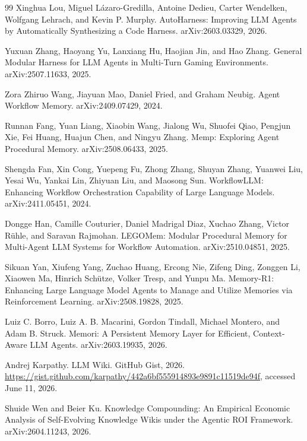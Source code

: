 \documentclass{article}
\begin{document}
\begin{thebibliography}{99}
Xinghua Lou, Miguel L\'azaro-Gredilla, Antoine Dedieu, Carter Wendelken, Wolfgang Lehrach, and Kevin P. Murphy.
\newblock AutoHarness: Improving LLM Agents by Automatically Synthesizing a Code Harness.
\newblock arXiv:2603.03329, 2026.

Yuxuan Zhang, Haoyang Yu, Lanxiang Hu, Haojian Jin, and Hao Zhang.
\newblock General Modular Harness for LLM Agents in Multi-Turn Gaming Environments.
\newblock arXiv:2507.11633, 2025.

Zora Zhiruo Wang, Jiayuan Mao, Daniel Fried, and Graham Neubig.
\newblock Agent Workflow Memory.
\newblock arXiv:2409.07429, 2024.

Runnan Fang, Yuan Liang, Xiaobin Wang, Jialong Wu, Shuofei Qiao, Pengjun Xie, Fei Huang, Huajun Chen, and Ningyu Zhang.
\newblock Memp: Exploring Agent Procedural Memory.
\newblock arXiv:2508.06433, 2025.

Shengda Fan, Xin Cong, Yuepeng Fu, Zhong Zhang, Shuyan Zhang, Yuanwei Liu, Yesai Wu, Yankai Lin, Zhiyuan Liu, and Maosong Sun.
\newblock WorkflowLLM: Enhancing Workflow Orchestration Capability of Large Language Models.
\newblock arXiv:2411.05451, 2024.

Dongge Han, Camille Couturier, Daniel Madrigal Diaz, Xuchao Zhang, Victor R\"uhle, and Saravan Rajmohan.
\newblock LEGOMem: Modular Procedural Memory for Multi-Agent LLM Systems for Workflow Automation.
\newblock arXiv:2510.04851, 2025.

Sikuan Yan, Xiufeng Yang, Zuchao Huang, Ercong Nie, Zifeng Ding, Zonggen Li, Xiaowen Ma, Hinrich Sch\"utze, Volker Tresp, and Yunpu Ma.
\newblock Memory-R1: Enhancing Large Language Model Agents to Manage and Utilize Memories via Reinforcement Learning.
\newblock arXiv:2508.19828, 2025.

Luiz C. Borro, Luiz A. B. Macarini, Gordon Tindall, Michael Montero, and Adam B. Struck.
\newblock Memori: A Persistent Memory Layer for Efficient, Context-Aware LLM Agents.
\newblock arXiv:2603.19935, 2026.

Andrej Karpathy.
\newblock LLM Wiki.
\newblock GitHub Gist, 2026.
\newblock \url{https://gist.github.com/karpathy/442a6bf555914893e9891c11519de94f}, accessed June 11, 2026.

Shuide Wen and Beier Ku.
\newblock Knowledge Compounding: An Empirical Economic Analysis of Self-Evolving Knowledge Wikis under the Agentic ROI Framework.
\newblock arXiv:2604.11243, 2026.


\end{thebibliography}
\end{document}
